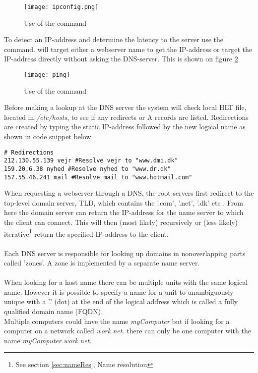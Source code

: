 \documentclass[Preamble]{subfiles}
\begin{document}
\begin{figure}[H]
\centering
\texttt{[image: ipconfig.png]}
\caption{Use of the command }
\label{fig:ipconfig}
\end{figure}

To detect an IP-address and determine the latency to the server use the  command.
 will target either a webserver name to get the IP-address or target the IP-address directly without asking the DNS-server.
This is shown on figure \ref{fig:ping}


\begin{figure}[H]
\centering
\texttt{[image: ping]}
\caption{Use of the command }
\label{fig:ping}
\end{figure}


Before making a lookup at the DNS server the system will check local HLT file, located in  \textit{/etc/hosts}, to see if any redirects or A records are listed.
Redirections are created by typing the static IP-address followed by the new logical name as shown in code snippet below.


\begin{lstlisting}[caption={Hosts file redirection}, style=Code-Bash, label=lst:redirect]
# Redirections
212.130.55.139 vejr #Resolve vejr to "www.dmi.dk"
159.20.6.38 nyhed #Resolve nyhed to "www.dr.dk"
157.55.46.241 mail #Resolve mail to "www.hotmail.com"
\end{lstlisting}

\vspace{10px}

When requesting a webserver through a DNS, the root servers first redirect to the top-level domain server, TLD, which contains the '.com', '.net', '.dk' etc \cite[p. 192]{Tanenbaum}.
From here the domain server can return the IP-address for the name server to which the client can connect. 
This will then (most likely) recursively or (less likely) iterative\footnote{See section \ref{sec:nameRes}, Name resolution} return the specified IP-address to the client.
\\
\\
Each DNS server is responsible for looking up domains in nonoverlapping parts called 'zones'. 
A zone is implemented by a separate name server\cite[p. 202-205]{Tanenbaum}.
\\
\\
When looking for a host name there can be multiple units with the same logical name. 
However it is possible to specify a name for a unit to unambiguously unique with a '.' (dot) at the end of the logical address which is called a fully qualified domain name (FQDN)\cite{wiki-fqdn}.
\\
Multiple computers could have the name \textit{myComputer} but if looking for a computer on a network called \textit{work.net.} there can only be one computer with the name \textit{myComputer.work.net.}
\end{document}
